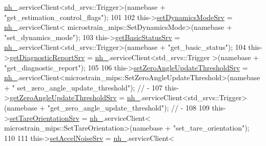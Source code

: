 \begin{DoxyCode}
      \hyperlink{classmicrostrain__mips__client_1_1ClMicrostainMips_a9fa8bd8b528fb13bf655f87b950a145c}{nh\_}.serviceClient<std\_srvs::Trigger>(namebase + \textcolor{stringliteral}{"get\_estimation\_control\_flags"});
101 
102                 this->\hyperlink{classmicrostrain__mips__client_1_1ClMicrostainMips_a2cf19dcbf3cd63d2ba3624cebb73c912}{setDynamicsModeSrv} = \hyperlink{classmicrostrain__mips__client_1_1ClMicrostainMips_a9fa8bd8b528fb13bf655f87b950a145c}{nh\_}.serviceClient<
      microstrain\_mips::SetDynamicsMode>(namebase + \textcolor{stringliteral}{"set\_dynamics\_mode"});
103                 this->\hyperlink{classmicrostrain__mips__client_1_1ClMicrostainMips_a9d9417b8082c318709d5644895a4f539}{getBasicStatusSrv} = \hyperlink{classmicrostrain__mips__client_1_1ClMicrostainMips_a9fa8bd8b528fb13bf655f87b950a145c}{nh\_}.serviceClient<std\_srvs::Trigger>(namebase
       + \textcolor{stringliteral}{"get\_basic\_status"});
104                 this->\hyperlink{classmicrostrain__mips__client_1_1ClMicrostainMips_ad691fdf83a768d37090963580e187f1e}{getDiagnosticReportSrv} = \hyperlink{classmicrostrain__mips__client_1_1ClMicrostainMips_a9fa8bd8b528fb13bf655f87b950a145c}{nh\_}.serviceClient<std\_srvs::Trigger
      >(namebase + \textcolor{stringliteral}{"get\_diagnostic\_report"});
105 
106                 this->\hyperlink{classmicrostrain__mips__client_1_1ClMicrostainMips_aa512e932514eba1022ac4453942dfb68}{setZeroAngleUpdateThresholdSrv} = 
      \hyperlink{classmicrostrain__mips__client_1_1ClMicrostainMips_a9fa8bd8b528fb13bf655f87b950a145c}{nh\_}.serviceClient<microstrain\_mips::SetZeroAngleUpdateThreshold>(namebase + \textcolor{stringliteral}{"
      set\_zero\_angle\_update\_threshold"}); \textcolor{comment}{//  -}
107                 this->\hyperlink{classmicrostrain__mips__client_1_1ClMicrostainMips_ad9cf264fdf8bf949b89a34bbebfa6c69}{getZeroAngleUpdateThresholdSrv} = 
      \hyperlink{classmicrostrain__mips__client_1_1ClMicrostainMips_a9fa8bd8b528fb13bf655f87b950a145c}{nh\_}.serviceClient<std\_srvs::Trigger>(namebase + \textcolor{stringliteral}{"get\_zero\_angle\_update\_threshold"});                     
              \textcolor{comment}{//  -}
108 
109                 this->\hyperlink{classmicrostrain__mips__client_1_1ClMicrostainMips_abd7ae5a9a62f4a571d05ad07ade23905}{setTareOrientationSrv} = \hyperlink{classmicrostrain__mips__client_1_1ClMicrostainMips_a9fa8bd8b528fb13bf655f87b950a145c}{nh\_}.serviceClient<
      microstrain\_mips::SetTareOrientation>(namebase + \textcolor{stringliteral}{"set\_tare\_orientation"});
110 
111                 this->\hyperlink{classmicrostrain__mips__client_1_1ClMicrostainMips_a9131cf72e9303a83abce526c3780b5df}{setAccelNoiseSrv} = \hyperlink{classmicrostrain__mips__client_1_1ClMicrostainMips_a9fa8bd8b528fb13bf655f87b950a145c}{nh\_}.serviceClient<

\end{DoxyCode}

